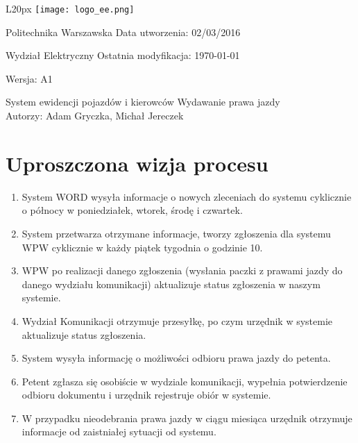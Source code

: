\documentclass[a4paper, 12pt]{article}
\begin{document}
\begin{wrapfigure}{L}{20px}
\texttt{[image: logo\_ee.png]}
\end{wrapfigure}

Politechnika Warszawska 
\hfill Data utworzenia: 02/03/2016

Wydział Elektryczny
\hfill Ostatnia modyfikacja: \today

\hfill Wersja: A1

\quad
\begin{center}
\center \Huge System ewidencji pojazdów i kierowców 
\center \large Wydawanie prawa jazdy
\vspace{0.5cm}\\
\small Autorzy: Adam Gryczka, Michał Jereczek
\end{center}

\tableofcontents
\pagebreak

\section{Uproszczona wizja procesu}
\begin{enumerate}
	\item System WORD wysyła informacje o nowych zleceniach do systemu cyklicznie o północy w poniedziałek, wtorek, środę i czwartek.
    \item System przetwarza otrzymane informacje, tworzy zgłoszenia dla systemu WPW cyklicznie w każdy piątek tygodnia o godzinie 10.
    \item WPW po realizacji danego zgłoszenia (wysłania paczki z prawami jazdy do danego wydziału komunikacji) aktualizuje status zgłoszenia w naszym systemie.
    \item Wydział Komunikacji otrzymuje przesyłkę, po czym urzędnik w systemie aktualizuje status zgłoszenia. 
    \item System wysyła informację o możliwości odbioru prawa jazdy do petenta.  
    \item Petent zgłasza się osobiście w wydziale komunikacji, wypełnia potwierdzenie odbioru dokumentu i urzędnik rejestruje obiór w systemie.
    \item W przypadku nieodebrania prawa jazdy w ciągu miesiąca urzędnik otrzymuje informacje od  zaistniałej sytuacji od systemu.
\end{enumerate}

\pagebreak
\end{document}
